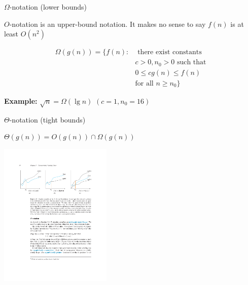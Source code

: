 \documentclass{beamer}
\begin{document}
\begin{frame}{$\Omega$-notation (lower bounds)}
    \begin{block}{}
        $O$-notation is an upper-bound notation.  It makes no sense to say $f(n)$ is at least $O(n^2)$
    \end{block}
    \begin{tcolorbox}
        \begin{align*}
            \Omega(g(n)) = \{ f(n):  & \text{ there exist constants } \\
                                                   & c > 0, n_0 > 0 \text{ such that } \\
                                                   & 0 \leq cg(n) \leq f(n) \\
                                                   & \text{for all } n \geq n_0\}
        \end{align*}
    \end{tcolorbox}
    \begin{exampleblock}{\textbf{Example:}}
        \vspace{2mm}
        $ \sqrt{n} = \Omega(\lg n) $ \hspace{5mm} $(c = 1, n_0 = 16)$ \\
    \end{exampleblock}
\end{frame}

\begin{frame}{$\Theta$-notation (tight bounds)}
    \begin{tcolorbox}
        $\Theta(g(n)) = O(g(n)) \cap \Omega(g(n))$
    \end{tcolorbox}
    \vspace{5mm}
    \centering
    \includegraphics[width=0.4\textwidth, trim={13.90cm 18.75cm 3.23cm 4.60cm}, clip]{figures/bigs}
\end{frame}
\end{document}
